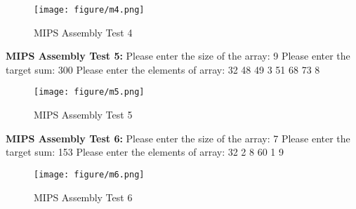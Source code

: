 \documentclass[twoside,11pt]{article}
\begin{document}
\begin{figure}[h]
\caption{MIPS Assembly Test 4}
\centering
\texttt{[image: figure/m4.png]}
\end{figure}

\newpage

\textbf{MIPS Assembly Test 5:} \newline
Please enter the size of the array: 9 \newline
Please enter the target sum: 300 \newline
Please enter the elements of array:  32 48 49 3 51 68 73 8 \newline

\begin{figure}[h]
\caption{MIPS Assembly Test 5}
\centering
\texttt{[image: figure/m5.png]}
\end{figure}

\textbf{MIPS Assembly Test 6:} \newline
Please enter the size of the array: 7 \newline
Please enter the target sum: 153 \newline
Please enter the elements of array:  32 2 8 60 1 9 \newline

\begin{figure}[h]
\caption{MIPS Assembly Test 6}
\centering
\texttt{[image: figure/m6.png]}
\end{figure}
\end{document}
